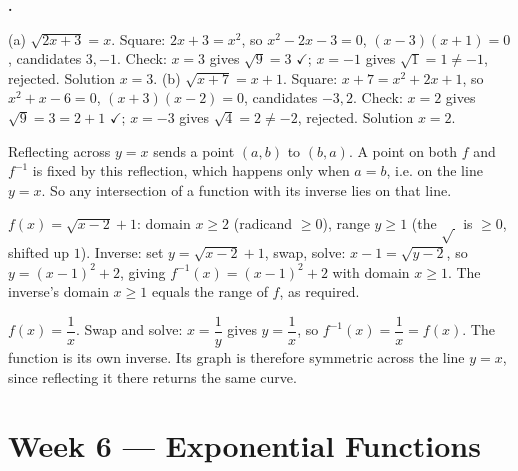 \documentclass[12pt]{book}
\let\originalcheckmark\checkmark
\renewcommand{\checkmark}{\ensuremath{\originalcheckmark}}
\newcounter{soln}[section]
\newenvironment{solutions}{%
  \setcounter{soln}{0}%
  \begin{list}{\textbf{\arabic{soln}.}}{%
    \usecounter{soln}\setlength{\leftmargin}{2.2em}\setlength{\itemsep}{10pt}}%
}{\end{list}}
\begin{document}
\begin{solutions}
\item (a) $\sqrt{2x+3}=x$. Square: $2x+3=x^2$, so $x^2-2x-3=0$, $(x-3)(x+1)=0$,
candidates $3,-1$. Check: $x=3$ gives $\sqrt9=3$ \checkmark; $x=-1$ gives $\sqrt1=1\ne-1$,
rejected. Solution $x=3$. (b) $\sqrt{x+7}=x+1$. Square: $x+7=x^2+2x+1$, so
$x^2+x-6=0$, $(x+3)(x-2)=0$, candidates $-3,2$. Check: $x=2$ gives $\sqrt9=3=2+1$
\checkmark; $x=-3$ gives $\sqrt4=2\ne-2$, rejected. Solution $x=2$.

\item Reflecting across $y=x$ sends a point $(a,b)$ to $(b,a)$. A point on both $f$ and
$f^{-1}$ is fixed by this reflection, which happens only when $a=b$, i.e. on the line
$y=x$. So any intersection of a function with its inverse lies on that line.

\item $f(x)=\sqrt{x-2}+1$: domain $x\ge2$ (radicand $\ge0$), range $y\ge1$ (the
$\sqrt{\,}$ is $\ge0$, shifted up $1$). Inverse: set $y=\sqrt{x-2}+1$, swap, solve:
$x-1=\sqrt{y-2}$, so $y=(x-1)^2+2$, giving $f^{-1}(x)=(x-1)^2+2$ with domain $x\ge1$.
The inverse's domain $x\ge1$ equals the range of $f$, as required.

\item $f(x)=\dfrac1x$. Swap and solve: $x=\dfrac1y$ gives $y=\dfrac1x$, so
$f^{-1}(x)=\dfrac1x=f(x)$. The function is its own inverse. Its graph is therefore
symmetric across the line $y=x$, since reflecting it there returns the same curve.
\end{solutions}

\section*{Week 6 — Exponential Functions}
\setcounter{section}{6}
\end{document}
